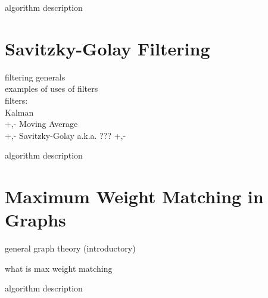 algorithm description

\section{Savitzky-Golay Filtering} \label{sec:theorBack-SavitzkyGolay}

filtering generals\\
examples of uses of filters\\
filters:\\
	Kalman\\
		+,-
	Moving Average\\
		+,-
	Savitzky-Golay a.k.a. ???
		+,-

algorithm description

\section{Maximum Weight Matching in Graphs} \label{sec:theorBack-MWMGraphs}

general graph theory (introductory)

what is max weight matching

algorithm description
